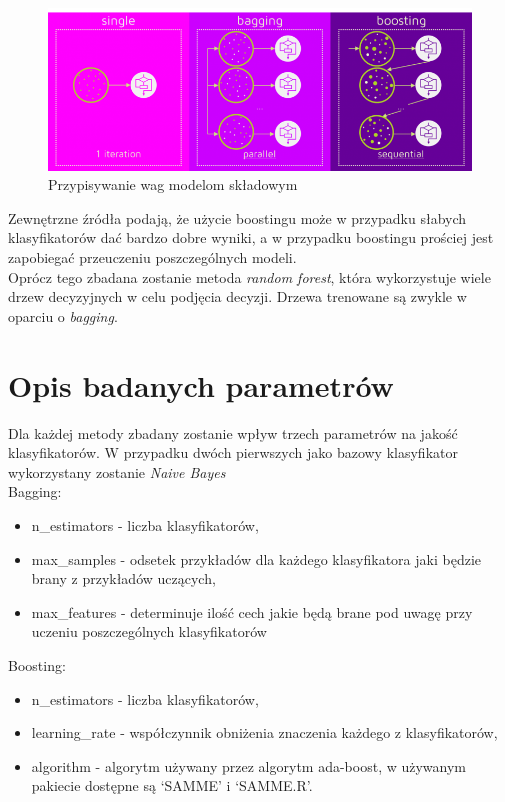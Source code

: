 \documentclass[12pt,a4paper]{article}
\begin{document}
\begin{figure}[H]
\centering
\includegraphics{choseWorks.png}
\caption{Przypisywanie wag modelom składowym}
\end{figure}
Zewnętrzne źródła podają, że użycie boostingu może w przypadku słabych klasyfikatorów dać bardzo dobre wyniki, a w przypadku boostingu prościej jest zapobiegać przeuczeniu poszczególnych modeli.\\
Oprócz tego zbadana zostanie metoda \textit{random forest}, która wykorzystuje wiele drzew decyzyjnych w celu podjęcia decyzji. Drzewa trenowane są zwykle w oparciu o \textit{bagging}.

\section{Opis badanych parametrów}
Dla każdej metody zbadany zostanie wpływ trzech parametrów na jakość klasyfikatorów. W przypadku dwóch pierwszych jako bazowy klasyfikator wykorzystany zostanie \textit{Naive Bayes}\\

Bagging:
\begin{itemize}
  \item n\_estimators - liczba klasyfikatorów,
  \item max\_samples  - odsetek przykładów dla każdego klasyfikatora jaki będzie brany z przykładów uczących,
  \item max\_features  - determinuje ilość cech jakie będą brane pod uwagę przy uczeniu poszczególnych klasyfikatorów
\end{itemize}

Boosting:
\begin{itemize}
  \item n\_estimators  - liczba klasyfikatorów,
  \item learning\_rate   - współczynnik obniżenia znaczenia każdego z klasyfikatorów,
  \item algorithm - algorytm używany przez algorytm ada-boost, w używanym pakiecie dostępne są ‘SAMME’ i ‘SAMME.R’.
\end{itemize}
\end{document}
